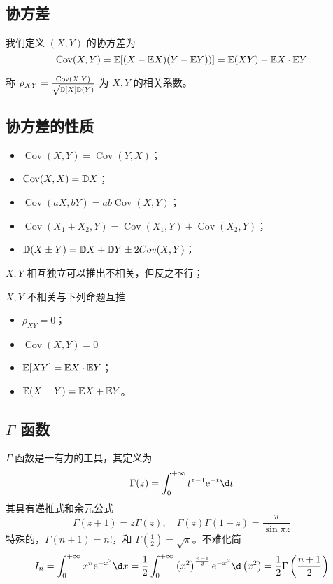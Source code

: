 \subsection*{协方差}

\newcommand{\opCov}{\operatorname{Cov}}

我们定义 $(X, Y)$ 的协方差为
\[ \opCov(X, Y) = \bbE[(X - \bbE X)(Y - \bbE Y))] = \bbE(XY) - \bbE X \cdot \bbE Y \]

称 $\rho_{XY} = \frac{\opCov(X, Y)}{\sqrt{\bbD [X] \bbD(Y)}}$ 为 $X, Y$ 的相关系数。



\subsection*{协方差的性质}

\begin{itemize}
	\item $\opCov(X, Y) = \opCov(Y, X)$；
	\item $\opCov(X, X) = \bbD X$；
	\item $\opCov(aX, bY) = ab \opCov(X, Y)$；
	\item $\opCov(X_1 + X_2, Y) = \opCov(X_1, Y) + \opCov(X_2, Y)$；
	\item $\mathbb{D}(X \pm Y) = \mathbb{D} X + \mathbb{D} Y \pm 2Cov(X, Y)$；
\end{itemize}

$X, Y$ 相互独立可以推出不相关，但反之不行；

$X, Y$ 不相关与下列命题互推
\begin{itemize}
	\item $\rho_{XY} = 0$；
	\item $\opCov(X, Y) = 0$
	\item $\mathbb{E}[XY] = \mathbb{E} X \cdot \mathbb{E} Y$；
	\item $\mathbb{E}(X \pm Y) = \mathbb{E} X + \mathbb{E} Y$。
\end{itemize}

\subsection{\texorpdfstring{$\Gamma$ 函数}{Γ 函数}}

$\Gamma$ 函数是一有力的工具，其定义为
\[ \Gamma(z) = \int_{0}^{+\infty} t^{z-1} \ee^{-t} \d t \]
其具有递推式和余元公式
\[ \Gamma(z + 1) = z \Gamma(z), \quad \Gamma(z) \Gamma(1-z) = \frac{\pi}{\sin \pi z} \]
特殊的，$\Gamma(n + 1) = n!$，和 $\Gamma(\frac{1}{2}) = \sqrt{\pi}$。不难化简
\[ I_n = \int_{0}^{+\infty} x^n \ee^{-x^2} \d x = \frac{1}{2} \int_{0}^{+\infty} \left(x^2\right)^{\frac{n-1}{2}} \ee^{-x^2} \d \left(x^2\right) = \frac{1}{2} \Gamma\left(\frac{n+1}{2}\right)  \]

